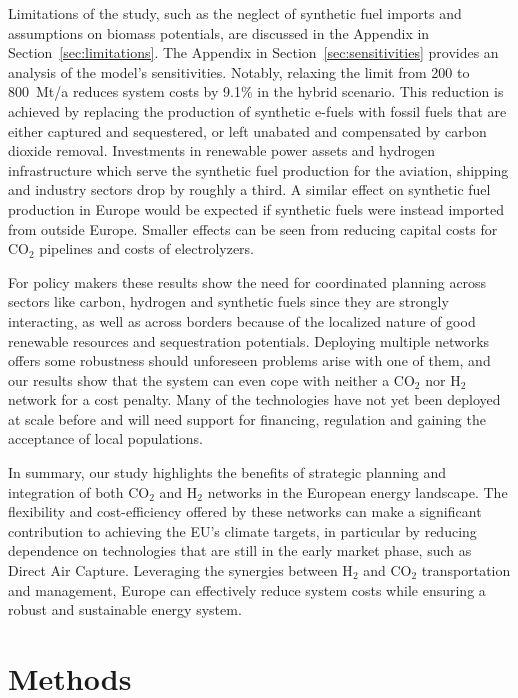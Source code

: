 \documentclass[twocolumn]{article}
\newcommand{\carbon}{CO$_2$}
\newcommand{\hydrogen}{H$_2$}
\begin{document}
Limitations of the study, such as the neglect of synthetic fuel imports and assumptions on biomass potentials, are discussed in the Appendix in Section~\ref{sec:limitations}.
The Appendix in Section~\ref{sec:sensitivities} provides an analysis of the model's sensitivities. Notably, relaxing the limit from 200 to 800~Mt/a reduces system costs by 9.1\% in the hybrid scenario. This reduction is achieved by replacing the production of synthetic e-fuels with fossil fuels that are either captured and sequestered, or left unabated and compensated by carbon dioxide removal. Investments in renewable power assets and hydrogen infrastructure which serve the synthetic fuel production for the aviation, shipping and industry sectors drop by roughly a third. A similar effect on synthetic fuel production in Europe would be expected if synthetic fuels were instead imported from outside Europe. Smaller effects can be seen from reducing capital costs for \carbon{} pipelines and costs of electrolyzers.

For policy makers these results show the need for coordinated planning across sectors like carbon, hydrogen and synthetic fuels since they are strongly interacting, as well as across borders because of the localized nature of good renewable resources and sequestration potentials. Deploying multiple networks offers some robustness should unforeseen problems arise with one of them, and our results show that the system can even cope with neither a \carbon{} nor \hydrogen{} network for a cost penalty.  Many of the technologies have not yet been deployed at scale before and will need support for financing, regulation and gaining the acceptance of local populations.

In summary, our study highlights the benefits of strategic planning and integration of both \carbon{} and \hydrogen{} networks in the European energy landscape. The flexibility and cost-efficiency offered by these networks can make a significant contribution to achieving the EU's climate targets, in particular by reducing dependence on technologies that are still in the early market phase, such as Direct Air Capture. Leveraging the synergies between \hydrogen{} and \carbon{} transportation and management, Europe can effectively reduce system costs while ensuring a robust and sustainable energy system.


\section*{Methods}
\label{sec:methodology}
\end{document}
